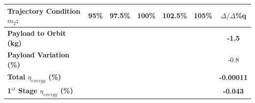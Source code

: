 \begin{table}[ht]
	\centering
	
	\begin{tabular}{l c c c c c c} 
	\hline \textbf{Trajectory Condition  \qquad  $m_{2}$: }
	&95\%
	&97.5\%
	&100\%
	& 102.5\%
	& 105\%
	& $\Delta/\Delta$\%q
		\\
		\hline \textbf{Payload to Orbit (kg)}
		& \textbf{\PayloadToOrbitmSPARTANNinetyFiveNoReturn}
		& \textbf{\PayloadToOrbitmSPARTANNinetySevenFiveNoReturn}
		& \textbf{\PayloadToOrbitmSPARTANStandardNoReturn}
		& \textbf{\PayloadToOrbitmSPARTANOneHundredTwoFiveNoReturn}
		& \textbf{\PayloadToOrbitmSPARTANOneHundredFiveNoReturn}
		&\textbf{-1.5}
		\\
		\textbf{Payload Variation (\%)}
		& \PayloadVarmSPARTANNinetyFiveNoReturn
		& \PayloadVarmSPARTANNinetySevenFiveNoReturn
		& \PayloadVarmSPARTANStandardNoReturn
		& \PayloadVarmSPARTANOneHundredTwoFiveNoReturn
		& \PayloadVarmSPARTANOneHundredFiveNoReturn
		&-0.8
		\\
		\textbf{Total $\eta_{exergy}$ (\%)}
		& \textbf{\totalExergyEffmSPARTANNinetyFiveNoReturn}
		& \textbf{\totalExergyEffmSPARTANNinetySevenFiveNoReturn}
		& \textbf{\totalExergyEffmSPARTANStandardNoReturn}
		& \textbf{\totalExergyEffmSPARTANOneHundredTwoFiveNoReturn}
		& \textbf{\totalExergyEffmSPARTANOneHundredFiveNoReturn}
		& \textbf{-0.00011}
		\\
		\hline 
		\textbf{1$^{st}$ Stage $\eta_{exergy}$ (\%)}
		& \textbf{\firstExergyEffmSPARTANNinetyFiveNoReturn}
		& \textbf{\firstExergyEffmSPARTANNinetySevenFiveNoReturn}
		& \textbf{\firstExergyEffmSPARTANStandardNoReturn}
		& \textbf{\firstExergyEffmSPARTANOneHundredTwoFiveNoReturn}
		& \textbf{\firstExergyEffmSPARTANOneHundredFiveNoReturn}
		& \textbf{-0.043}
		\\
	

\end{tabular}
\end{table}
